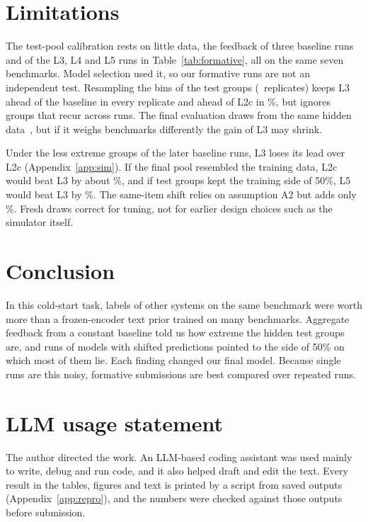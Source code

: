 \documentclass{article}
\begin{document}
\section{Limitations}
\label{sec:limits}
The test-pool calibration rests on little data, the feedback of three baseline runs and of the L3, L4 and L5 runs in Table~\ref{tab:formative}, all on the same seven benchmarks.
Model selection used it, so our formative runs are not an independent test.
Resampling the bins of the test groups (\BootReps\ replicates) keeps L3 ahead of the baseline in every replicate and ahead of L2c in \BootRCLthreeLtwocP\%, but ignores groups that recur across runs.
The final evaluation draws from the same hidden data~\citep{paiec}, but if it weighs benchmarks differently the gain of L3 may shrink.

Under the less extreme groups of the later baseline runs, L3 loses its lead over L2c (Appendix~\ref{app:sim}).
If the final pool resembled the training data, L2c would beat L3 by about \ShortTwocThreeAllU\%, and if test groups kept the training side of 50\%, L5 would beat L3 by \ShortFiveThreeTrain\%.
The same-item shift relies on assumption A2 but adds only \ShortExactStep\%.
Fresh draws correct for tuning, not for earlier design choices such as the simulator itself.

\section{Conclusion}
\label{sec:conclusion}
In this cold-start task, labels of other systems on the same benchmark were worth more than a frozen-encoder text prior trained on many benchmarks.
Aggregate feedback from a constant baseline told us how extreme the hidden test groups are, and runs of models with shifted predictions pointed to the side of 50\% on which most of them lie. Each finding changed our final model.
Because single runs are this noisy, formative submissions are best compared over repeated runs.

\section*{LLM usage statement}
The author directed the work.
An LLM-based coding assistant was used mainly to write, debug and run code, and it also helped draft and edit the text.
Every result in the tables, figures and text is printed by a script from saved outputs (Appendix~\ref{app:repro}), and the numbers were checked against those outputs before submission.
\end{document}
